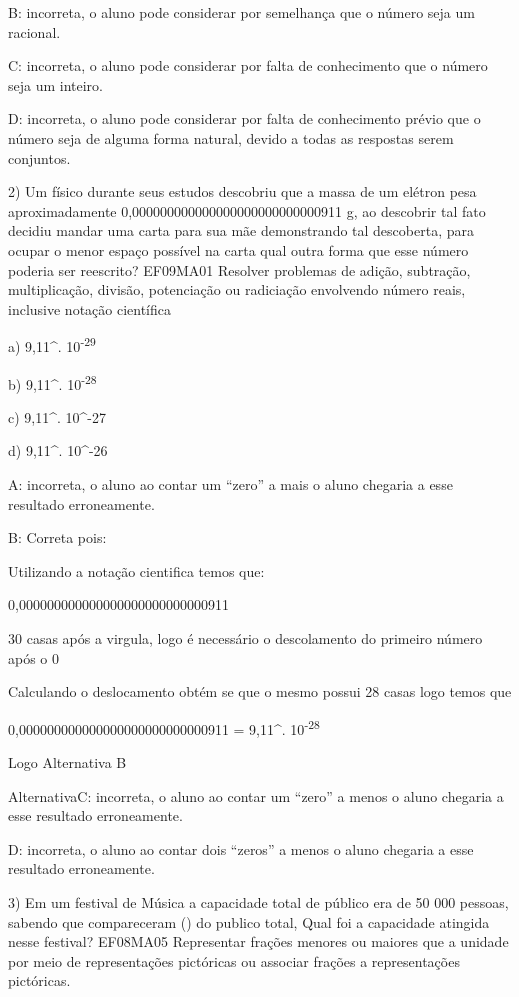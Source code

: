 B: incorreta, o aluno pode considerar por semelhança que o número seja
um racional.

C: incorreta, o aluno pode considerar por falta de conhecimento que o
número seja um inteiro.

D: incorreta, o aluno pode considerar por falta de conhecimento prévio
que o número seja de alguma forma natural, devido a todas as respostas
serem conjuntos.

2) Um físico durante seus estudos descobriu que a massa de um elétron
pesa aproximadamente 0,000000000000000000000000000911 g, ao descobrir
tal fato decidiu mandar uma carta para sua mãe demonstrando tal
descoberta, para ocupar o menor espaço possível na carta qual outra
forma que esse número poderia ser reescrito? EF09MA01 Resolver problemas
de adição, subtração, multiplicação, divisão, potenciação ou radiciação
envolvendo número reais, inclusive notação científica

a) 9,11^{.} 10\textsuperscript{-29}

b) 9,11^{.} 10\textsuperscript{-28}

c) 9,11^{.} 10^{-27}

d) 9,11^{.} 10^{-26}

A: incorreta, o aluno ao contar um ``zero'' a mais o aluno chegaria a
esse resultado erroneamente.

B: Correta pois:

Utilizando a notação cientifica temos que:

0,000000000000000000000000000911

30 casas após a virgula, logo é necessário o descolamento do primeiro
número após o 0

Calculando o deslocamento obtém se que o mesmo possui 28 casas logo
temos que

0,000000000000000000000000000911 = 9,11^{.}
10\textsuperscript{-28}

Logo Alternativa B

AlternativaC: incorreta, o aluno ao contar um ``zero'' a menos o aluno
chegaria a esse resultado erroneamente.

D: incorreta, o aluno ao contar dois ``zeros'' a menos o aluno chegaria
a esse resultado erroneamente.

3) Em um festival de Música a capacidade total de público era de 50 000
pessoas, sabendo que compareceram () do publico total,
Qual foi a capacidade atingida nesse festival? EF08MA05 Representar
frações menores ou maiores que a unidade por meio de representações
pictóricas ou associar frações a representações pictóricas.

